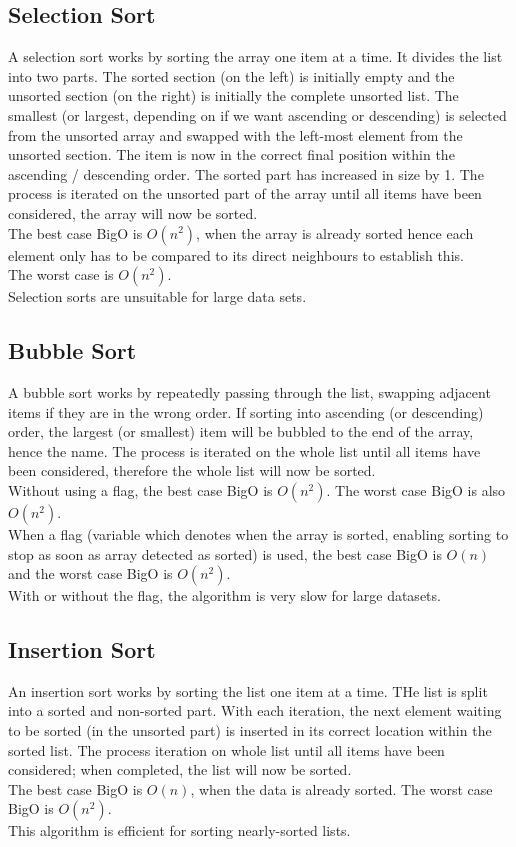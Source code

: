 \subsection{Selection Sort}
A selection sort works by sorting the array one item at a time. It divides the list into two parts. The sorted section (on the left) is initially empty and the unsorted section (on the right) is initially the complete unsorted list. The smallest (or largest, depending on if we want ascending or descending) is selected from the unsorted array and swapped with the left-most element from the unsorted section. The item is now in the correct final position within the ascending / descending order. The sorted part has increased in size by 1. The process is iterated on the unsorted part of the array until all items have been considered, the array will now be sorted.\\

The best case BigO is $O(n^2)$, when the array is already sorted hence each element only has to be compared to its direct neighbours to establish this.\\

The worst case is $O(n^2)$.\\

Selection sorts are unsuitable for large data sets.

\subsection{Bubble Sort}
A bubble sort works by repeatedly passing through the list, swapping adjacent items if they are in the wrong order. If sorting into ascending (or descending) order, the largest (or smallest) item will be bubbled to the end of the array, hence the name. The process is iterated on the whole list until all items have been considered, therefore the whole list will now be sorted.\\

Without using a flag, the best case BigO is $O(n^2)$. The worst case BigO is also $O(n^2)$.\\

When a flag (variable which denotes when the array is sorted, enabling sorting to stop as soon as array detected as sorted) is used, the best case BigO is $O(n)$ and the worst case BigO is $O(n^2)$.\\

With or without the flag, the algorithm is very slow for large datasets.

\subsection{Insertion Sort}
An insertion sort works by sorting the list one item at a time. THe list is split into a sorted and non-sorted part. With each iteration, the next element waiting to be sorted (in the unsorted part) is inserted in its correct location within the sorted list. The process iteration on whole list until all items have been considered; when completed, the list will now be sorted.\\

The best case BigO is $O(n)$, when the data is already sorted. The worst case BigO is $O(n^2)$.\\

This algorithm is efficient for sorting nearly-sorted lists. 